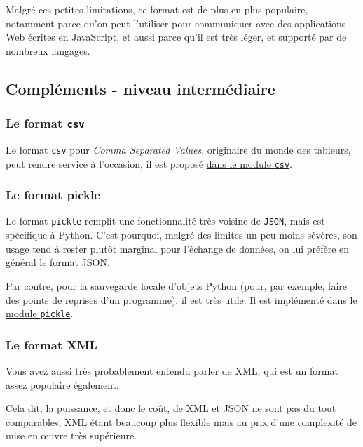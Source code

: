    Malgré ces petites limitations, ce format est de plus en plus populaire,
notamment parce qu'on peut l'utiliser pour communiquer avec des
applications Web écrites en JavaScript, et aussi parce qu'il est très
léger, et supporté par de nombreux langages.

    \hypertarget{compluxe9ments---niveau-intermuxe9diaire}{%
\subsection{Compléments - niveau
intermédiaire}\label{compluxe9ments---niveau-intermuxe9diaire}}

    \hypertarget{le-format-csv}{%
\subsubsection{\texorpdfstring{Le format
\texttt{csv}}{Le format csv}}\label{le-format-csv}}

    Le format \texttt{csv} pour \emph{Comma Separated Values}, originaire du
monde des tableurs, peut rendre service à l'occasion, il est proposé
\href{https://docs.python.org/3/library/csv.html}{dans le module
\texttt{csv}}.

    \hypertarget{le-format-pickle}{%
\subsubsection{Le format pickle}\label{le-format-pickle}}

    Le format \texttt{pickle} remplit une fonctionnalité très voisine de
\texttt{JSON}, mais est spécifique à Python. C'est pourquoi, malgré des
limites un peu moins sévères, son usage tend à rester plutôt marginal
pour l'échange de données, on lui préfère en général le format JSON.

Par contre, pour la sauvegarde locale d'objets Python (pour, par
exemple, faire des points de reprises d'un programme), il est très
utile. Il est implémenté
\href{https://docs.python.org/3/library/pickle.html}{dans le module
\texttt{pickle}}.

    \hypertarget{le-format-xml}{%
\subsubsection{Le format XML}\label{le-format-xml}}

    Vous avez aussi très probablement entendu parler de XML, qui est un
format assez populaire également.

Cela dit, la puissance, et donc le coût, de XML et JSON ne sont pas du
tout comparables, XML étant beaucoup plus flexible mais au prix d'une
complexité de mise en œuvre très supérieure.

